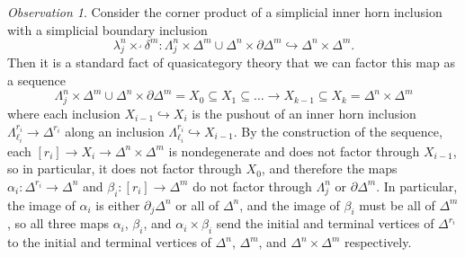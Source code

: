 \documentclass{amsart}
\numberwithin{equation}{section}
\theoremstyle{plain}   %
\theoremstyle{remark}
\newtheorem{obs}[subsection]{Observation}
\theoremstyle{plain}
\begin{document}
\begin{obs}\label{simplicialhorns}
	Consider the corner product of a simplicial inner horn inclusion with a simplicial boundary inclusion  
	\[\lambda^n_j\times^\lrcorner \delta^m: \Lambda^n_j \times \Delta^m \cup \Delta^n \times \partial \Delta^m \hookrightarrow \Delta^n\times \Delta^m.\]
	Then it is a standard fact of quasicategory theory that we can factor this map as a sequence
	\[\Lambda^n_j \times \Delta^m \cup \Delta^n \times \partial \Delta^m = X_0 \subseteq X_1 \subseteq \dots \to X_{k-1} \subseteq X_k=\Delta^n\times \Delta^m\]
	where each inclusion \(X_{i-1}\hookrightarrow X_i\) is the pushout of an inner horn inclusion \(\Lambda^{r_i}_{\ell_i} \to \Delta^{r_i}\) along an inclusion \(\Lambda^{r_i}_{\ell_i}\hookrightarrow X_{i-1}\).  By the construction of the sequence, each \([r_i]\to X_i\to \Delta^n\times \Delta^m\) is nondegenerate and does not factor through \(X_{i-1}\), so in particular, it does not factor through \(X_0\), and therefore the maps \(\alpha_i:\Delta^{r_i} \to \Delta^n\) and \(\beta_i:[r_i]\to \Delta^m\) do not factor through \(\Lambda^n_j\) or \(\partial \Delta^m\).  In particular, the image of \(\alpha_i\) is either \(\partial_j\Delta^n\) or all of \(\Delta^n\), and the image of \(\beta_i\) must be all of \(\Delta^m\), so all three maps \(\alpha_i\), \(\beta_i\), and \(\alpha_i \times \beta_i\) send the initial and terminal vertices of \(\Delta^{r_i}\) to the initial and terminal vertices of \(\Delta^n\), \(\Delta^m\), and \(\Delta^n\times\Delta^m\) respectively.
\end{obs}
\end{document}
